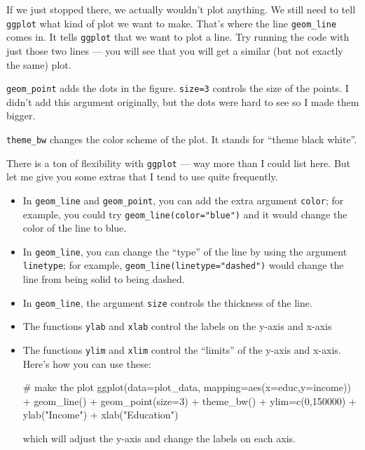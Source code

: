 \documentclass[
  letterpaper,
  DIV=11,
  numbers=noendperiod]{scrreprt}
\newenvironment{Shaded}{\begin{snugshade}}{\end{snugshade}}
\newcommand{\AttributeTok}[1]{\textcolor[rgb]{0.40,0.45,0.13}{#1}}
\newcommand{\CommentTok}[1]{\textcolor[rgb]{0.37,0.37,0.37}{#1}}
\newcommand{\DecValTok}[1]{\textcolor[rgb]{0.68,0.00,0.00}{#1}}
\newcommand{\FunctionTok}[1]{\textcolor[rgb]{0.28,0.35,0.67}{#1}}
\newcommand{\NormalTok}[1]{\textcolor[rgb]{0.00,0.23,0.31}{#1}}
\newcommand{\OtherTok}[1]{\textcolor[rgb]{0.00,0.23,0.31}{#1}}
\newcommand{\SpecialCharTok}[1]{\textcolor[rgb]{0.37,0.37,0.37}{#1}}
\newcommand{\StringTok}[1]{\textcolor[rgb]{0.13,0.47,0.30}{#1}}
\begin{document}
If we just stopped there, we actually wouldn't plot anything. We still
need to tell \texttt{ggplot} what kind of plot we want to make. That's
where the line \texttt{geom\_line} comes in. It tells \texttt{ggplot}
that we want to plot a line. Try running the code with just those two
lines --- you will see that you will get a similar (but not exactly the
same) plot.

\texttt{geom\_point} adds the dots in the figure. \texttt{size=3}
controls the size of the points. I didn't add this argument originally,
but the dots were hard to see so I made them bigger.

\texttt{theme\_bw} changes the color scheme of the plot. It stands for
``theme black white''.

There is a ton of flexibility with \texttt{ggplot} --- way more than I
could list here. But let me give you some extras that I tend to use
quite frequently.

\begin{itemize}
\item
  In \texttt{geom\_line} and \texttt{geom\_point}, you can add the extra
  argument \texttt{color}; for example, you could try
  \texttt{geom\_line(color="blue")} and it would change the color of the
  line to blue.
\item
  In \texttt{geom\_line}, you can change the ``type'' of the line by
  using the argument \texttt{linetype}; for example,
  \texttt{geom\_line(linetype="dashed")} would change the line from
  being solid to being dashed.
\item
  In \texttt{geom\_line}, the argument \texttt{size} controls the
  thickness of the line.
\item
  The functions \texttt{ylab} and \texttt{xlab} control the labels on
  the y-axis and x-axis
\item
  The functions \texttt{ylim} and \texttt{xlim} control the ``limits''
  of the y-axis and x-axis. Here's how you can use these:

\begin{Shaded}
\begin{Highlighting}[]
\CommentTok{\# make the plot}
\FunctionTok{ggplot}\NormalTok{(}\AttributeTok{data=}\NormalTok{plot\_data,}
     \AttributeTok{mapping=}\FunctionTok{aes}\NormalTok{(}\AttributeTok{x=}\NormalTok{educ,}\AttributeTok{y=}\NormalTok{income)) }\SpecialCharTok{+}
  \FunctionTok{geom\_line}\NormalTok{() }\SpecialCharTok{+} 
  \FunctionTok{geom\_point}\NormalTok{(}\AttributeTok{size=}\DecValTok{3}\NormalTok{) }\SpecialCharTok{+} 
  \FunctionTok{theme\_bw}\NormalTok{() }\SpecialCharTok{+} 
\NormalTok{  ylim}\OtherTok{=}\FunctionTok{c}\NormalTok{(}\DecValTok{0}\NormalTok{,}\DecValTok{150000}\NormalTok{) }\SpecialCharTok{+} 
  \FunctionTok{ylab}\NormalTok{(}\StringTok{"Income"}\NormalTok{) }\SpecialCharTok{+} 
  \FunctionTok{xlab}\NormalTok{(}\StringTok{"Education"}\NormalTok{)}
\end{Highlighting}
\end{Shaded}

  which will adjust the y-axis and change the labels on each axis.
\end{itemize}
\end{document}
